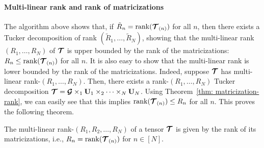 \paragraph{Multi-linear rank and rank of matricizations}
The algorithm above shows that, if $\tilde R_n = \mathrm{rank}(\bm{\mathcal{T}}_{(n)})$ for all $n$, then there exists a Tucker decomposition of rank $(\tilde R_1,\dots, \tilde R_N)$, showing that the multi-linear rank $( R_1,\dots, R_N)$ of $\bm{\mathcal{T}}$ is upper bounded by the rank of the matricizations: $ R_n \leq \mathrm{rank}(\bm{\mathcal{T}}_{(n)} )$ for all $n$. It is also easy to show that the multi-linear rank is lower bounded by the rank of the matricizations. Indeed, suppose $\bm{\mathcal{T}}$ has multi-linear rank-$(R_1,\dots, R_N)$. Then, there exists a rank-$(R_1,\dots, R_N)$ Tucker decomposition $\bm{\mathcal{T}} = \bm{\mathcal{G}}\times_1\mathbf{U}_1\times_2 \dots \times_N \mathbf{U}_N$. Using Theorem~\ref{thm: matricization-rank}, we can easily see that this implies $\mathrm{rank}(\bm{\mathcal{T}}_{(n)} )\leq  R_n$ for all $n$.
This proves the following theorem.
\begin{theorem}
The multi-linear rank-$(R_1,R_2,\dots, R_N)$ of a tensor $\bm{\mathcal{T}}$ is given by the rank of its matricizations, i.e., $R_n = \mathrm{rank}(\bm{\mathcal{T}}_{(n)})$ for $n\in[N]$.
\end{theorem}


